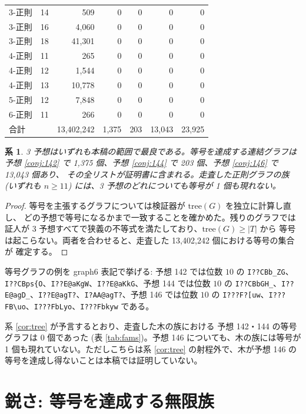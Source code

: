 \documentclass[paper=a4,fontsize=10.5pt,jafontsize=10.5pt]{jlreq}
\theoremstyle{plain}
\newtheorem{corollary}[theorem]{系}
\theoremstyle{definition}
\begin{document}
\begin{table}[htbp]
\begin{tabular}{lrrrrrr}
3-正則 & 14 & 509 & 0 & 0 & 0 & 0 \\
3-正則 & 16 & 4,060 & 0 & 0 & 0 & 0 \\
3-正則 & 18 & 41,301 & 0 & 0 & 0 & 0 \\
4-正則 & 11 & 265 & 0 & 0 & 0 & 0 \\
4-正則 & 12 & 1,544 & 0 & 0 & 0 & 0 \\
4-正則 & 13 & 10,778 & 0 & 0 & 0 & 0 \\
5-正則 & 12 & 7,848 & 0 & 0 & 0 & 0 \\
6-正則 & 11 & 266 & 0 & 0 & 0 & 0 \\
\midrule
\multicolumn{2}{l}{合計} & 13,402,242 & 1,375 & 203
& 13,043 & 23,925 \\
\bottomrule
\end{tabular}
\end{table}

\begin{corollary}\label{cor:eq}
3 予想はいずれも本稿の範囲で最良である。等号を達成する連結グラフは
予想 \ref{conj:142} で 1,375 個、予想 \ref{conj:144} で
203 個、予想 \ref{conj:146} で 13,043 個あり、
その全リストが証明書に含まれる。走査した正則グラフの族 (いずれも $n \ge 11$) には、3 予想のどれについても等号が 1 個も現れない。
\end{corollary}

\begin{proof}
等号を主張するグラフについては検証器が $\mathrm{tree}(G)$ を独立に計算し直し、
どの予想で等号になるかまで一致することを確かめた。残りのグラフでは証人が
3 予想すべてで狭義の不等式を満たしており、$\mathrm{tree}(G) \ge |T|$ から
等号は起こらない。両者を合わせると、走査した 13,402,242 個における等号の集合が
確定する。
\end{proof}

等号グラフの例を graph6 表記で挙げる: 予想 142 では位数 $10$ の \texttt{I??CBb\_ZG}、\texttt{I??CBps\{O}、\texttt{I??E@aKgW}、\texttt{I??E@aKkG}、予想 144 では位数 $10$ の \texttt{I??CBbGH\_}、\texttt{I??E@agD\_}、\texttt{I??E@agT?}、\texttt{I?AA@agT?}、予想 146 では位数 $10$ の \texttt{I???F?[uw}、\texttt{I???FB\textbackslash{}uo}、\texttt{I???FbLyo}、\texttt{I???Fbkyw} である。

系 \ref{cor:tree} が予言するとおり、走査した木の族における 予想 142・144 の等号グラフは 0 個であった (表 \ref{tab:fams})。予想 146 についても、木の族には等号が 1 個も現れていない。ただしこちらは系 \ref{cor:tree} の射程外で、木が予想 146 の等号を達成し得ないことは本稿では証明していない。

\section{鋭さ: 等号を達成する無限族}\label{sec:sharp}
\end{document}
